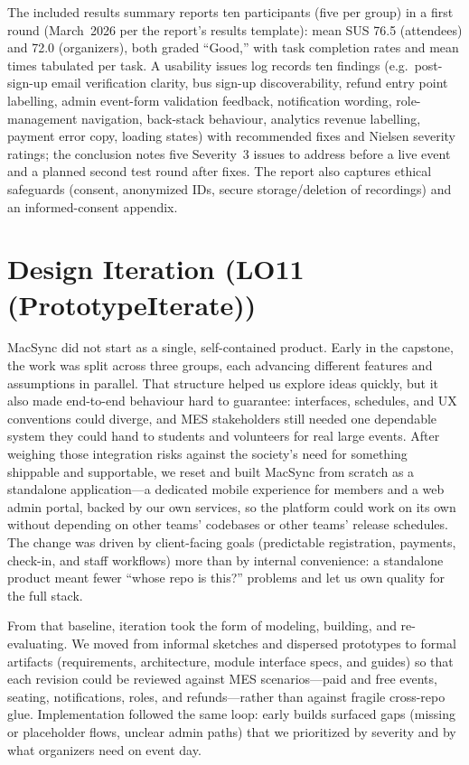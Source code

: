 \documentclass{article}
\begin{document}
The included results summary reports ten participants (five per
group) in a first round (March~2026 per the report's results template): mean SUS
76.5 (attendees) and 72.0 (organizers), both graded ``Good,''
with task completion rates and mean times tabulated per task. A usability issues
log records ten findings (e.g.\ post-sign-up email verification clarity, bus
sign-up discoverability, refund entry point labelling, admin event-form
validation feedback, notification wording, role-management navigation, back-stack
behaviour, analytics revenue labelling, payment error copy, loading states) with
recommended fixes and Nielsen severity ratings; the conclusion notes five
Severity~3 issues to address before a live event and a planned second test
round after fixes. The report also captures ethical safeguards (consent,
anonymized IDs, secure storage/deletion of recordings) and an informed-consent
appendix.

\section{Design Iteration (LO11 (PrototypeIterate))}

MacSync did not start as a single, self-contained product. Early in the capstone,
the work was split across three groups, each advancing different features
and assumptions in parallel. That structure helped
us explore ideas quickly, but it also made end-to-end behaviour hard to guarantee:
interfaces, schedules, and UX conventions could diverge, and MES stakeholders
still needed one dependable system they could hand to students and
volunteers for real large events. After weighing those integration risks against
the society's need for something shippable and supportable, we reset and
built MacSync from scratch as a standalone application---a dedicated mobile
experience for members and a web admin portal, backed by our own services, so the
platform could work on its own without depending on other teams' codebases
or other teams' release schedules. The change was driven by client-facing goals (predictable
registration, payments, check-in, and staff workflows) more than by internal
convenience: a standalone product meant fewer ``whose repo is this?'' problems
and let us own quality for the full stack.

From that baseline, iteration took the form of modeling, building, and
re-evaluating. We moved from informal sketches and dispersed prototypes to formal
artifacts (requirements, architecture, module interface specs, and guides) so
that each revision could be reviewed against MES scenarios---paid and free
events, seating, notifications, roles, and refunds---rather than against
fragile cross-repo glue. Implementation followed the same loop: early builds
surfaced gaps (missing or placeholder flows, unclear admin paths) that we
prioritized by severity and by what organizers need on event day.
\end{document}
